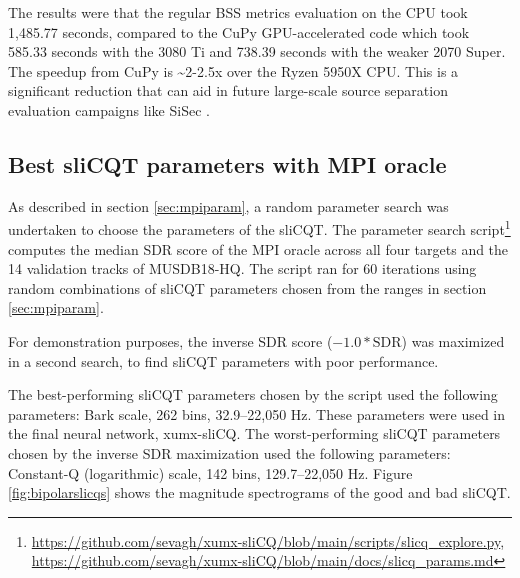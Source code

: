 \documentclass[report.tex]{subfiles}
\begin{document}
The results were that the regular BSS metrics evaluation on the CPU took 1,485.77 seconds, compared to the CuPy GPU-accelerated code which took 585.33 seconds with the 3080 Ti and 738.39 seconds with the weaker 2070 Super. The speedup from CuPy is \textasciitilde 2-2.5x over the Ryzen 5950X CPU. This is a significant reduction that can aid in future large-scale source separation evaluation campaigns like SiSec \parencite{sisec2016, sisec2018}.

\newpagefill

\subsection{Best sliCQT parameters with MPI oracle}

As described in section \ref{sec:mpiparam}, a random parameter search was undertaken to choose the parameters of the sliCQT. The parameter search script\footnote{\url{https://github.com/sevagh/xumx-sliCQ/blob/main/scripts/slicq_explore.py}, \url{https://github.com/sevagh/xumx-sliCQ/blob/main/docs/slicq_params.md}} computes the median SDR score of the MPI oracle across all four targets and the 14 validation tracks of MUSDB18-HQ. The script ran for 60 iterations using random combinations of sliCQT parameters chosen from the ranges in section \ref{sec:mpiparam}.

For demonstration purposes, the inverse SDR score ($-1.0*\text{SDR}$) was maximized in a second search, to find sliCQT parameters with poor performance.

The best-performing sliCQT parameters chosen by the script used the following parameters: Bark scale, 262 bins, 32.9--22,050 Hz. These parameters were used in the final neural network, xumx-sliCQ. The worst-performing sliCQT parameters chosen by the inverse SDR maximization used the following parameters: Constant-Q (logarithmic) scale, 142 bins, 129.7--22,050 Hz. Figure \ref{fig:bipolarslicqs} shows the magnitude spectrograms of the good and bad sliCQT.
\end{document}
